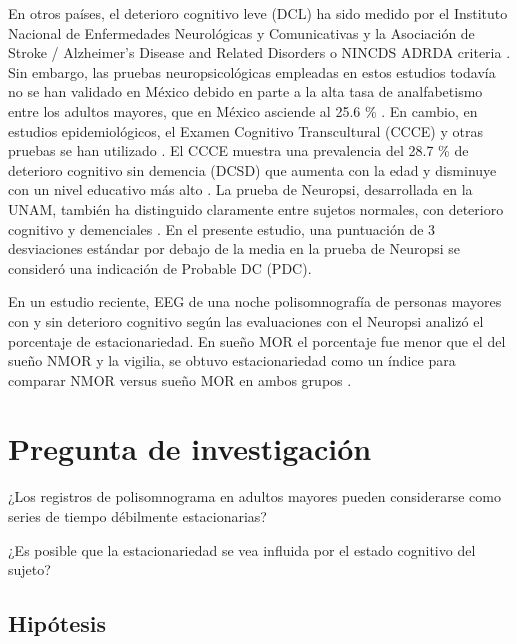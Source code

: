 En otros países, el deterioro cognitivo leve (DCL) ha sido medido por el Instituto Nacional de Enfermedades
Neurológicas y Comunicativas y la Asociación de Stroke / Alzheimer's Disease and Related Disorders o NINCDS ADRDA criteria \cite{McKhann}. Sin embargo, las pruebas neuropsicológicas empleadas en estos estudios todavía no se han validado en México debido en parte a la alta tasa de analfabetismo entre los adultos mayores, que en México asciende
al 25.6 \% \cite{CONAPO2010}. En cambio, en estudios epidemiológicos, el Examen Cognitivo Transcultural (CCCE) y otras pruebas se han utilizado \cite{Rosales-Lagarde2016}. El CCCE muestra una prevalencia del 28.7 \% de deterioro cognitivo sin demencia (DCSD) que aumenta con la edad y disminuye con un nivel educativo más alto \cite{Mejia-Arango2011}. La prueba de Neuropsi, desarrollada en la UNAM, también ha distinguido claramente entre sujetos normales, con deterioro cognitivo y demenciales \cite{Ostrosky1999, Abrisqueta, Montes2012}. En el presente estudio, una puntuación de 3 desviaciones estándar por debajo de la media en la prueba de Neuropsi se consideró una indicación de Probable DC (PDC).

En un estudio reciente, EEG de una noche polisomnografía de personas mayores con y sin deterioro cognitivo según las evaluaciones con el Neuropsi analizó el porcentaje de estacionariedad.  En sueño MOR el porcentaje fue menor que el del sueño NMOR y la vigilia, se obtuvo estacionariedad  como un índice para comparar NMOR versus sueño MOR en ambos grupos \cite{ROSALESLAGARDE2017}.

\section{Pregunta de investigación}

¿Los registros de polisomnograma en adultos mayores pueden considerarse como series de tiempo 
débilmente estacionarias? 


%
¿Es posible que la estacionariedad se vea influida por el estado cognitivo del sujeto?


\subsection{Hipótesis}

